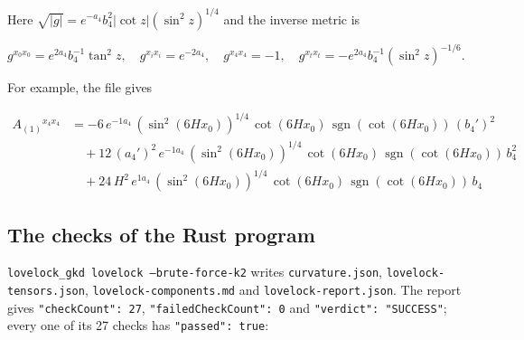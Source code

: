 \documentclass[11pt]{article}
\begin{document}
Here $\sqrt{|g|} = e^{-a_4}b_4^2|\cot z|(\sin^2z)^{1/4}$ and the inverse metric is

\[
g^{x_0x_0} = e^{2a_4}b_4^{-1}\tan^2z,\quad g^{x_ix_i} = e^{-2a_4},\quad g^{x_4x_4} = -1,\quad g^{x_tx_t} = -e^{2a_4}b_4^{-1}(\sin^2z)^{-1/6} .
\]

For example, the file gives

\[
\begin{aligned}
A_{(1)}{}^{x_4x_4} &= -6\,e^{-1 a_4}\,(\sin^2(6Hx_0))^{1/4}\,\cot(6Hx_0)\,\operatorname{sgn}(\cot(6Hx_0))\,(b_4')^{2} \\
&\quad + 12\,(a_4')^{2}\,e^{-1 a_4}\,(\sin^2(6Hx_0))^{1/4}\,\cot(6Hx_0)\,\operatorname{sgn}(\cot(6Hx_0))\,b_4^{2} \\
&\quad + 24\,H^{2}\,e^{1 a_4}\,(\sin^2(6Hx_0))^{1/4}\,\cot(6Hx_0)\,\operatorname{sgn}(\cot(6Hx_0))\,b_4
\end{aligned}
\]

\subsection{The checks of the Rust program}

\texttt{lovelock\allowbreak{}\_gkd lov\allowbreak{}elock --\allowbreak{}brute-fo\allowbreak{}rce-k2} writes \texttt{curvatur\allowbreak{}e.json}, \texttt{lovelock\allowbreak{}-tensors\allowbreak{}.json}, \texttt{lovelock\allowbreak{}-compone\allowbreak{}nts.md} and \texttt{lovelock\allowbreak{}-report.\allowbreak{}json}. The report gives \texttt{"checkCo\allowbreak{}unt": 27}, \texttt{"failedC\allowbreak{}heckCoun\allowbreak{}t": 0} and \texttt{"verdict\allowbreak{}": "SUCC\allowbreak{}ESS"}; every one of its 27 checks has \texttt{"passed"\allowbreak{}: true}:
\end{document}
